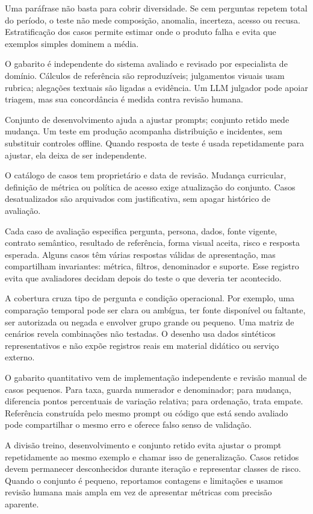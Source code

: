 Uma paráfrase não basta para cobrir diversidade. Se cem perguntas repetem total do período, o teste não mede composição, anomalia, incerteza, acesso ou recusa. Estratificação dos casos permite estimar onde o produto falha e evita que exemplos simples dominem a média.

O gabarito é independente do sistema avaliado e revisado por especialista de domínio. Cálculos de referência são reproduzíveis; julgamentos visuais usam rubrica; alegações textuais são ligadas a evidência. Um LLM julgador pode apoiar triagem, mas sua concordância é medida contra revisão humana.

Conjunto de desenvolvimento ajuda a ajustar prompts; conjunto retido mede mudança. Um teste em produção acompanha distribuição e incidentes, sem substituir controles offline. Quando resposta de teste é usada repetidamente para ajustar, ela deixa de ser independente.

O catálogo de casos tem proprietário e data de revisão. Mudança curricular, definição de métrica ou política de acesso exige atualização do conjunto. Casos desatualizados são arquivados com justificativa, sem apagar histórico de avaliação.

Cada caso de avaliação especifica pergunta, persona, dados, fonte vigente, contrato semântico, resultado de referência, forma visual aceita, risco e resposta esperada. Alguns casos têm várias respostas válidas de apresentação, mas compartilham invariantes: métrica, filtros, denominador e suporte. Esse registro evita que avaliadores decidam depois do teste o que deveria ter acontecido.

A cobertura cruza tipo de pergunta e condição operacional. Por exemplo, uma comparação temporal pode ser clara ou ambígua, ter fonte disponível ou faltante, ser autorizada ou negada e envolver grupo grande ou pequeno. Uma matriz de cenários revela combinações não testadas. O desenho usa dados sintéticos representativos e não expõe registros reais em material didático ou serviço externo.

O gabarito quantitativo vem de implementação independente e revisão manual de casos pequenos. Para taxa, guarda numerador e denominador; para mudança, diferencia pontos percentuais de variação relativa; para ordenação, trata empate. Referência construída pelo mesmo prompt ou código que está sendo avaliado pode compartilhar o mesmo erro e oferece falso senso de validação.

A divisão treino, desenvolvimento e conjunto retido evita ajustar o prompt repetidamente ao mesmo exemplo e chamar isso de generalização. Casos retidos devem permanecer desconhecidos durante iteração e representar classes de risco. Quando o conjunto é pequeno, reportamos contagens e limitações e usamos revisão humana mais ampla em vez de apresentar métricas com precisão aparente.

